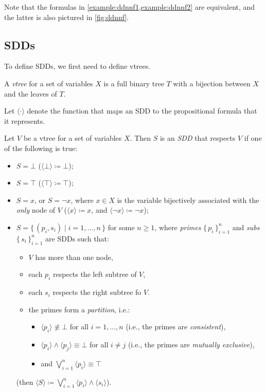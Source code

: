 Note that the formulas in \cref{example:ddnnf1,example:ddnnf2} are equivalent, and the latter is also pictured in \cref{fig:ddnnf}.

\subsection{SDDs} \label{sec:sdds}

To define SDDs, we first need to define vtrees.

\begin{definition}
  A \emph{vtree} for a set of variables $X$ is a full binary tree $T$ with a bijection between $X$ and the leaves of $T$.
\end{definition}

Let $\langle\cdot\rangle$ denote the function that maps an SDD to the propositional formula that it represents.

\begin{definition}
  Let $V$ be a vtree for a set of variables $X$. Then $S$ is an \emph{SDD} that respects $V$ if one of the following is true:
  \begin{itemize}
  \item $S = \bot$ ($\langle \bot \rangle \coloneqq \bot$);
  \item $S = \top$ ($\langle \top \rangle \coloneqq \top$);
  \item $S = x$, or $S = \neg x$, where $x \in X$ is the variable bijectively associated with the \emph{only} node of $V$ ($\langle x \rangle \coloneqq x$, and $\langle \neg x \rangle \coloneqq \neg x$);
  \item $S = \{\, (p_i, s_i) \mid i = 1, \dots, n \,\}$ for some $n \ge 1$, where \emph{primes} $\{\,p_i\,\}_{i=1}^n$ and \emph{subs} $\{\,s_i\,\}_{i=1}^n$ are SDDs such that:
    \begin{itemize}
    \item $V$ has more than one node,
    \item each $p_i$ respects the left subtree of $V$,
    \item each $s_i$ respects the right subtree fo $V$.
    \item the primes form a \emph{partition}, i.e.:
      \begin{itemize}
      \item $\langle p_i \rangle \not\equiv \bot$ for all $i = 1, \dots, n$ (i.e., the primes are \emph{consistent}),
      \item $\langle p_i \rangle \land \langle p_j \rangle \equiv \bot$ for all $i \ne j$ (i.e., the primes are \emph{mutually exclusive}),
      \item and $\bigvee_{i=1}^n \langle p_i \rangle \equiv \top$
      \end{itemize}
    \end{itemize}
    (then $\langle S \rangle \coloneqq \bigvee_{i=1}^n \langle p_i \rangle \land \langle s_i \rangle$).
  \end{itemize}
\end{definition}

